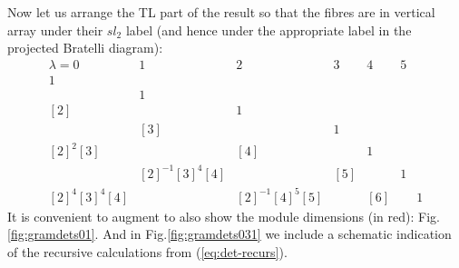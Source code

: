 \documentclass{article}
\theoremstyle{definition}
\numberwithin{equation}{subsection}
\begin{document}

%


Now let us arrange the TL part of the result so that
the fibres are in vertical array under their $sl_2$ label
(and hence under the appropriate label in the projected Bratelli diagram): 
\[
\begin{array}{ccccccccccc}
  \lambda=0         &  1             &  2      &  3  &  4  &  5   %
  \\ \hline
  1 \\ 
                   & 1  \\ 
   {[2]}           &                    & 1 \\ 
                  & [3]                &     & 1   \\ 
  {[ 2]}^2 [3]    &                     & [4] &      &  1  \\
                  & {[2]}^{-1} [3]^4 [4] &     & [5]   &    & 1 \\ 
{[2]}^4 [3]^4 [4]  &                    & {[2]}^{-1}[4]^5[5] &    & [6] & & 1 
\end{array}
\]
It is convenient to augment to also show the module dimensions (in red):
Fig.\ref{fig:gramdets01}.
And in Fig.\ref{fig:gramdets031} we include a schematic indication of the
recursive calculations from (\ref{eq:det-recurs}). 

\newcommand{\du}[2]{\begin{array}{c} \textcolor{red}{{#1}} \\ \hspace{-.321in}{#2}\hspace{-.321in} \end{array}}
\end{document}
